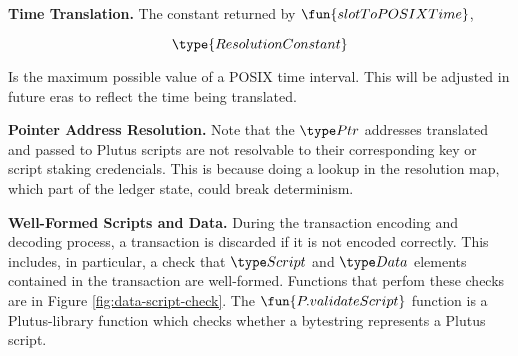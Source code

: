 \textbf{Time Translation. }
The constant returned by $\fun{slotToPOSIXTime}$,

\[\type{ResolutionConstant}\]

Is the maximum possible value of a POSIX time interval. This will be adjusted in
future eras to reflect the time being translated.

\textbf{Pointer Address Resolution. }
Note that the $\Ptr$ addresses translated and passed to Plutus scripts are
not resolvable to their corresponding key or script staking credencials. This
is because doing a lookup in the resolution map, which part of the ledger state,
could break determinism.

\textbf{Well-Formed Scripts and Data. }
During the transaction encoding and decoding process, a transaction is discarded if it is not
encoded correctly. This includes, in particular, a check that $\Script$ and $\Data$
elements contained in the transaction are well-formed. Functions that perfom these checks are
in Figure \ref{fig:data-script-check}. The $\fun{P.validateScript}$ function
is a Plutus-library function which checks whether a bytestring represents a
Plutus script.

